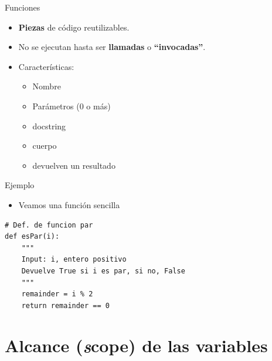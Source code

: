 \documentclass[mathserif]{beamer}
\begin{document}
\begin{frame}[fragile]{Funciones}
    \begin{itemize}
        \item {\blue\bfseries Piezas} de código reutilizables.
        
        \item No se ejecutan hasta ser {\orange\bfseries llamadas} o {\orange\bfseries ``invocadas''}.
        
        \item Características: 
        \begin{itemize}
            \item Nombre
            \item Parámetros (0 o más)
            \item {\blue docstring}
            \item cuerpo
            \item {\blue devuelven} un resultado
        \end{itemize}
    \end{itemize}
\end{frame}

\begin{frame}[fragile]{Ejemplo}
    \begin{itemize}
        \item Veamos una función sencilla
    \end{itemize}
\begin{lstlisting}
# Def. de funcion par
def esPar(i):
    """ 
    Input: i, entero positivo
    Devuelve True si i es par, si no, False
    """
    remainder = i % 2
    return remainder == 0
\end{lstlisting}
\end{frame}



\section{Alcance (\textit scope) de las variables}
\end{document}
